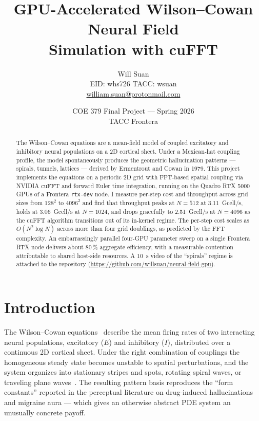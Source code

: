 \documentclass[11pt]{article}
\title{\vspace{-2.5em}GPU-Accelerated Wilson--Cowan Neural Field\\ Simulation with cuFFT}
\author{Will Suan \\
  EID: whs726 \quad TACC: wsuan \\
  \url{william.suan@protonmail.com}}
\date{COE 379 Final Project --- Spring 2026 \\ TACC Frontera}
\begin{document}
\maketitle

\begin{abstract}
  \noindent The Wilson--Cowan equations are a mean-field model of coupled
  excitatory and inhibitory neural populations on a 2D cortical sheet.
  Under a Mexican-hat coupling profile, the model spontaneously produces
  the geometric hallucination patterns --- spirals, tunnels, lattices ---
  derived by Ermentrout and Cowan in 1979. This project implements the
  equations on a periodic 2D grid with FFT-based spatial coupling via
  NVIDIA cuFFT and forward Euler time integration, running on the
  Quadro RTX 5000 GPUs of a Frontera \texttt{rtx-dev} node. I measure
  per-step cost and throughput across grid sizes from $128^{2}$ to
  $4096^{2}$ and find that throughput peaks at $N = 512$ at
  \SI{3.11}{Gcell/s}, holds at \SI{3.06}{Gcell/s} at $N = 1024$, and
  drops gracefully to \SI{2.51}{Gcell/s} at $N = 4096$ as the cuFFT
  algorithm transitions out of its in-kernel regime. The per-step cost
  scales as $O(N^{2} \log N)$ across more than four grid doublings, as
  predicted by the FFT complexity. An embarrassingly parallel four-GPU
  parameter sweep on a single Frontera RTX node delivers about 80\,\%
  aggregate efficiency, with a measurable contention attributable to
  shared host-side resources. A \SI{10}{\second} video of the
  ``spirals'' regime is attached to the repository
  (\url{https://github.com/willsuan/neural-field-gpu}).
\end{abstract}

\section{Introduction}
\label{sec:intro}

The Wilson--Cowan equations~\cite{wilson1972} describe the mean firing
rates of two interacting neural populations, excitatory ($E$) and
inhibitory ($I$), distributed over a continuous 2D cortical sheet. Under
the right combination of couplings the homogeneous steady state becomes
unstable to spatial perturbations, and the system organizes into
stationary stripes and spots, rotating spiral waves, or traveling
plane waves~\cite{ermentrout1979,bressloff2001}. The resulting pattern
basis reproduces the ``form constants'' reported in the perceptual
literature on drug-induced hallucinations and migraine aura --- which
gives an otherwise abstract PDE system an unusually concrete payoff.
\end{document}
